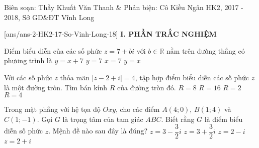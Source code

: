 
\begin{name}
{Biên soạn: Thầy Khuất Văn Thanh \& Phản biện: Cô Kiều Ngân}
{HK2, 2017 - 2018, Sở GD\&ĐT Vĩnh Long}
\end{name}
\setcounter{ex}{0}\setcounter{bt}{0}
[ans/ans-2-HK2-17-So-Vinh-Long-18]
\noindent\textbf{I. PHẦN TRẮC NGHIỆM}
\begin{ex}%
Điểm biểu diễn của các số phức $z=7+bi$ với $b\in\mathbb{R}$ nằm trên đường thẳng có phương trình là
\choice
{$y=x+7$}
{$y=7$}
{\True $x=7$}
{$y=x$}
\end{ex}

\begin{ex}%
Với các số phức $z$ thỏa mãn $\left|z-2+i\right|=4$, tập hợp điểm biểu diễn các số phức $z$ là một đường tròn. Tìm bán kính $R$ của đường tròn đó.
\choice
{$R=8$}
{$R=16$}
{$R=2$}
{\True $R=4$}
\end{ex}

\begin{ex}%
Trong mặt phẳng với hệ tọa độ $Oxy$, cho các điểm $A(4;0)$, $B(1;4)$ và $C(1;-1)$. Gọi $G$ là trọng tâm của tam giác $ABC$. Biết rằng $G$ là điểm biểu diễn số phức $z$. Mệnh đề nào sau đây là đúng?
\choice
{$z=3-\dfrac{3}{2}i$}
{$z=3+\dfrac{3}{2}i$}
{$z=2-i$}
{\True $z=2+i$}
\end{ex}

